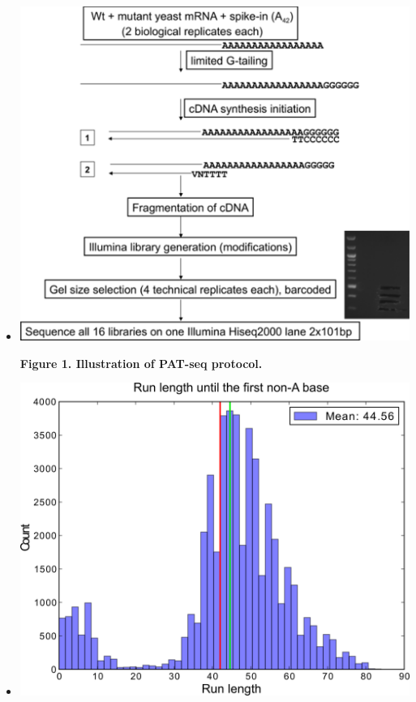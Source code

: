 \documentclass[10pt]{article}
\begin{document}
\begin{itemize}
\item[]{
\begin{center}
\includegraphics[scale=1.75]{Figure1.png}
\end{center}

\textbf{Figure 1. Illustration of PAT-seq protocol.}
}
\newpage

\item[]{
\begin{center}
\includegraphics[scale=1.5]{Figure2.png}
\end{center}

}
\end{itemize}
\end{document}
